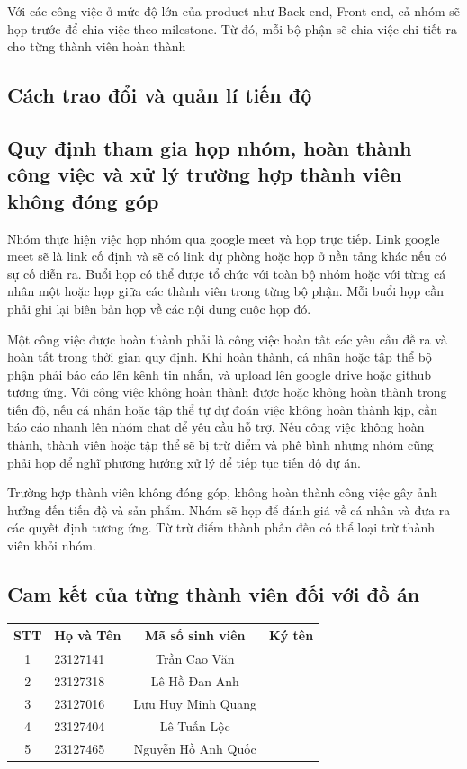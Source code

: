 Với các công việc ở mức độ lớn của product như Back end, Front end, cả nhóm sẽ họp trước để chia việc theo milestone. Từ đó, mỗi bộ phận sẽ chia việc chi tiết ra cho từng thành viên hoàn thành



\subsection{Cách trao đổi và quản lí tiến độ}

\subsection{Quy định tham gia họp nhóm, hoàn thành công việc và xử lý trường hợp thành viên không đóng góp}

Nhóm thực hiện việc họp nhóm qua google meet và họp trực tiếp. Link google meet sẽ là link cố định và sẽ có link dự phòng hoặc họp ở nền tảng khác nếu có sự cố diễn ra. Buổi họp có thể được tổ chức với toàn bộ nhóm hoặc với từng cá nhân một hoặc họp giữa các thành viên trong từng bộ phận. Mỗi buổi họp cần phải ghi lại biên bản họp về các nội dung cuộc họp đó.

Một công việc được hoàn thành phải là công việc hoàn tất các yêu cầu đề ra và hoàn tất trong thời gian quy định. Khi hoàn thành, cá nhân hoặc tập thể bộ phận phải báo cáo lên kênh tin nhắn, và upload lên google drive hoặc github tương ứng. Với công việc không hoàn thành được hoặc không hoàn thành trong tiến độ, nếu cá nhân hoặc tập thể tự dự đoán việc không hoàn thành kịp, cần báo cáo nhanh lên nhóm chat để yêu cầu hỗ trợ. Nếu công việc không hoàn thành, thành viên hoặc tập thể sẽ bị trừ điểm và phê bình nhưng nhóm cũng phải họp để nghĩ phương hướng xử lý để tiếp tục tiến độ dự án.

Trường hợp thành viên không đóng góp, không hoàn thành công việc gây ảnh hưởng đến tiến độ và sản phẩm. Nhóm sẽ họp để đánh giá về cá nhân và đưa ra các quyết định tương ứng. Từ trừ điểm thành phần đến có thể loại trừ thành viên khỏi nhóm.

\subsection{Cam kết của từng thành viên đối với đồ án}

\vspace{0.25cm}
\begin{tabular}{c l c c}
\toprule
\textbf{STT} & \textbf{Họ và Tên} & \textbf{Mã số sinh viên} & \textbf{Ký tên}\\
\midrule
1 & 23127141 & Trần Cao Văn & \\
2 & 23127318 & Lê Hồ Đan Anh & \\
3 & 23127016 & Lưu Huy Minh Quang & \\
4 & 23127404 & Lê Tuấn Lộc & \\
5 & 23127465 & Nguyễn Hồ Anh Quốc & \\
\bottomrule
\end{tabular}
